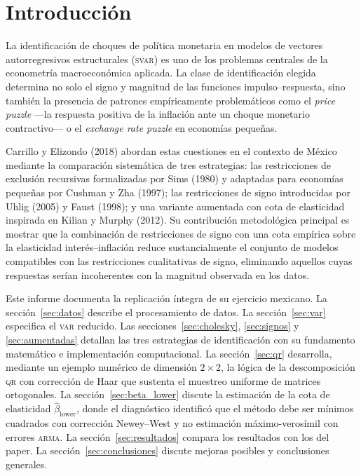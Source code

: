 \documentclass[11pt,letterpaper]{article}
\begin{document}
\section{Introducción}

La identificación de choques de política monetaria en modelos de vectores autorregresivos estructurales (\textsc{svar}) es uno de los problemas centrales de la econometría macroeconómica aplicada. La clase de identificación elegida determina no solo el signo y magnitud de las funciones impulso--respuesta, sino también la presencia de patrones empíricamente problemáticos como el \textit{price puzzle} —la respuesta positiva de la inflación ante un choque monetario contractivo— o el \textit{exchange rate puzzle} en economías pequeñas.

Carrillo y Elizondo (2018) abordan estas cuestiones en el contexto de México mediante la comparación sistemática de tres estrategias: las restricciones de exclusión recursivas formalizadas por Sims (1980) y adaptadas para economías pequeñas por Cushman y Zha (1997); las restricciones de signo introducidas por Uhlig (2005) y Faust (1998); y una variante aumentada con cota de elasticidad inspirada en Kilian y Murphy (2012). Su contribución metodológica principal es mostrar que la combinación de restricciones de signo con una cota empírica sobre la elasticidad interés--inflación reduce sustancialmente el conjunto de modelos compatibles con las restricciones cualitativas de signo, eliminando aquellos cuyas respuestas serían incoherentes con la magnitud observada en los datos.

Este informe documenta la replicación íntegra de su ejercicio mexicano. La sección~\ref{sec:datos} describe el procesamiento de datos. La sección~\ref{sec:var} especifica el \textsc{var} reducido. Las secciones~\ref{sec:cholesky}, \ref{sec:signos} y \ref{sec:aumentadas} detallan las tres estrategias de identificación con su fundamento matemático e implementación computacional. La sección~\ref{sec:qr} desarrolla, mediante un ejemplo numérico de dimensión $2\times 2$, la lógica de la descomposición \textsc{qr} con corrección de Haar que sustenta el muestreo uniforme de matrices ortogonales. La sección~\ref{sec:beta_lower} discute la estimación de la cota de elasticidad $\hat\beta_{\text{lower}}$, donde el diagnóstico identificó que el método debe ser mínimos cuadrados con corrección Newey--West y no estimación máximo-verosímil con errores \textsc{arma}. La sección~\ref{sec:resultados} compara los resultados con los del paper. La sección~\ref{sec:conclusiones} discute mejoras posibles y conclusiones generales.
\end{document}
